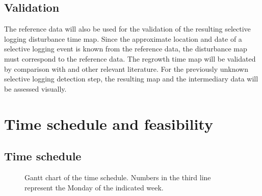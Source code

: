 \documentclass[a4paper,10pt]{article}
\begin{document}
\subsection{Validation}

The reference data will also be used for the validation of the resulting selective logging disturbance time map. Since the approximate location and date of a selective logging event is known from the reference data, the disturbance map must correspond to the reference data. The regrowth time map will be validated by comparison with \citet{broadbent_recovery_2006} and other relevant literature. For the previously unknown selective logging detection step, the resulting map and the intermediary data will be assessed visually.

\section{Time schedule and feasibility}

\subsection{Time schedule}

\begin{figure}
  \caption{Gantt chart of the time schedule. Numbers in the third line represent the Monday of the indicated week.}
  \label{fig-gantt}
\end{figure}
\end{document}
